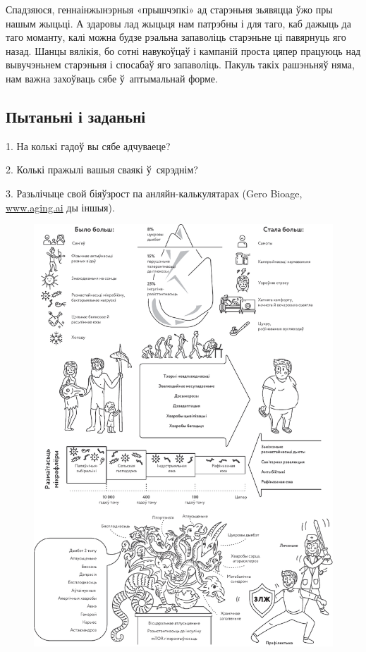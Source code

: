 Спадзяюся, геннаінжынэрныя «прышчэпкі» ад старэньня зьявяцца ўжо пры нашым жыцьці. А здаровы лад жыцьця нам патрэбны і для таго, каб дажыць да таго моманту, калі можна будзе рэальна запаволіць старэньне ці павярнуць яго назад. Шанцы вялікія, бо сотні навукоўцаў і кампаній проста цяпер працуюць над вывучэньнем старэньня і спосабаў яго запаволіць. Пакуль такіх рашэньняў няма, нам важна захоўваць сябе ў~аптымальнай форме.

\subsection*{Пытаньні і заданьні}

1. На колькі гадоў вы сябе адчуваеце?

2. Колькі пражылі вашыя сваякі ў~сярэднім?

3. Разьлічыце свой біяўзрост па анляйн-калькулятарах (Gero Bioage, \url{www.aging.ai} ды іншыя).

\clearpage
\thispagestyle{empty}
\begin{figure}[htb!]
  \vspace{-0.35in}
  \includegraphics[width=\textwidth]{willpower/ch2/full.pdf}  
\end{figure}

